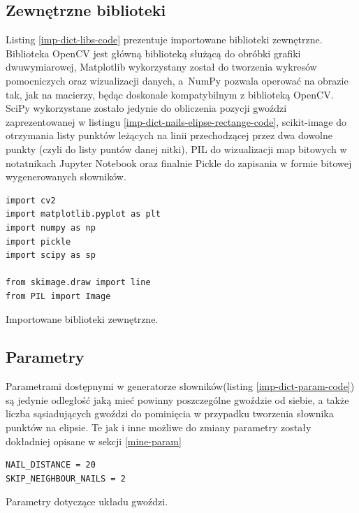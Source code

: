         \subsection{Zewnętrzne biblioteki} \label{imp-dict-libs}
        Listing \ref{imp-dict-libs-code} prezentuje importowane biblioteki zewnętrzne. Biblioteka OpenCV jest główną biblioteką służącą do obróbki grafiki dwuwymiarowej, Matplotlib wykorzystany został do tworzenia wykresów pomocniczych oraz wizualizacji danych, a~NumPy pozwala operować na obrazie tak, jak na macierzy, będąc doskonale kompatybilnym z biblioteką OpenCV. SciPy wykorzystane zostało jedynie do obliczenia pozycji gwoździ zaprezentowanej w listingu \ref{imp-dict-nails-elipse-rectange-code}, scikit-image do otrzymania listy punktów leżących na linii przechodzącej przez dwa dowolne punkty (czyli do listy puntów danej nitki), PIL do wizualizacji map bitowych w notatnikach Jupyter Notebook oraz finalnie Pickle do zapisania w formie bitowej wygenerowanych słowników.
        \begin{code}[H]
        \begin{verbatim}
import cv2
import matplotlib.pyplot as plt
import numpy as np
import pickle
import scipy as sp

from skimage.draw import line
from PIL import Image
        \end{verbatim}
        \caption{Importowane biblioteki zewnętrzne.}
        \label{imp-dict-libs-code}
        \end{code}
        
        \subsection{Parametry} \label{imp-dict-param}
        Parametrami dostępnymi w generatorze słowników(listing \ref{imp-dict-param-code}) są jedynie odległość jaką mieć powinny poszczególne gwoździe od siebie, a także liczba sąsiadujących gwoździ do pominięcia w przypadku tworzenia słownika punktów na elipsie. Te jak i inne możliwe do zmiany parametry zostały dokładniej opisane w sekcji \ref{mine-param}
        \begin{code}[H]
        \begin{verbatim}
NAIL_DISTANCE = 20
SKIP_NEIGHBOUR_NAILS = 2
        \end{verbatim}
        \caption{Parametry dotyczące układu gwoździ.}
        \label{imp-dict-param-code}
        \end{code}
        
